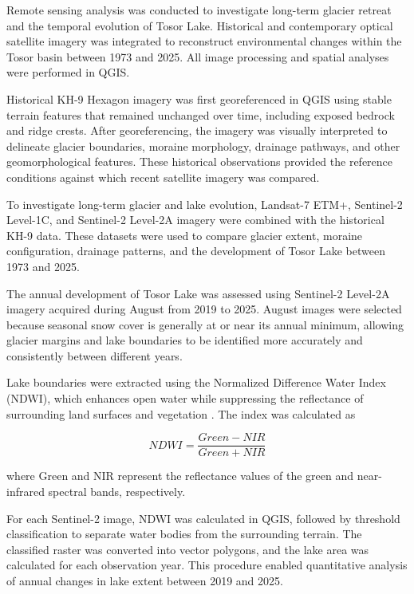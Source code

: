 \documentclass[12pt,a4paper]{report}
\begin{document}
Remote sensing analysis was conducted to investigate long-term glacier retreat and the temporal evolution of Tosor Lake. Historical and contemporary optical satellite imagery was integrated to reconstruct environmental changes within the Tosor basin between 1973 and 2025. All image processing and spatial analyses were performed in QGIS.

Historical KH-9 Hexagon imagery was first georeferenced in QGIS using stable terrain features that remained unchanged over time, including exposed bedrock and ridge crests. After georeferencing, the imagery was visually interpreted to delineate glacier boundaries, moraine morphology, drainage pathways, and other geomorphological features. These historical observations provided the reference conditions against which recent satellite imagery was compared.

To investigate long-term glacier and lake evolution, Landsat-7 ETM+, Sentinel-2 Level-1C, and Sentinel-2 Level-2A imagery were combined with the historical KH-9 data. These datasets were used to compare glacier extent, moraine configuration, drainage patterns, and the development of Tosor Lake between 1973 and 2025.

The annual development of Tosor Lake was assessed using Sentinel-2 Level-2A imagery acquired during August from 2019 to 2025. August images were selected because seasonal snow cover is generally at or near its annual minimum, allowing glacier margins and lake boundaries to be identified more accurately and consistently between different years.

Lake boundaries were extracted using the Normalized Difference Water Index (NDWI), which enhances open water while suppressing the reflectance of surrounding land surfaces and vegetation \cite{McFeeters1996}. The index was calculated as

\begin{equation}
NDWI=\frac{Green-NIR}{Green+NIR}
\end{equation}  

where Green and NIR represent the reflectance values of the green and near-infrared spectral bands, respectively.

For each Sentinel-2 image, NDWI was calculated in QGIS, followed by threshold classification to separate water bodies from the surrounding terrain. The classified raster was converted into vector polygons, and the lake area was calculated for each observation year. This procedure enabled quantitative analysis of annual changes in lake extent between 2019 and 2025.
\end{document}
